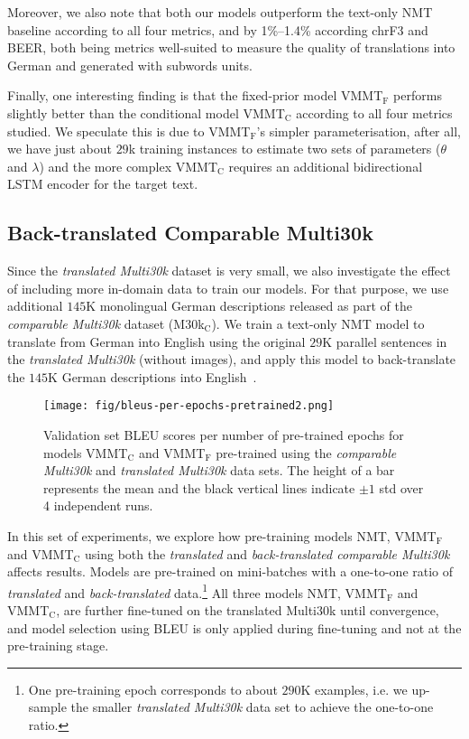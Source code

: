 \documentclass[11pt,a4paper]{article}
\newcommand{\cond}{VMMT$_{\text{C}}$\xspace}
\newcommand{\uncond}{VMMT$_{\text{F}}$\xspace}
\begin{document}
Moreover, we also note that both our models outperform the text-only NMT baseline according to all four metrics, and by 1\%--1.4\% according chrF3 and BEER, both being metrics well-suited to measure the quality of translations into German and generated with subwords units.

Finally, one interesting finding is that the fixed-prior model \uncond performs slightly better than the conditional model \cond according to all four metrics studied.
We speculate this is due to \uncond's simpler parameterisation, after all, we have just about $29$k training instances to estimate two sets of parameters ($\theta$ and $\lambda$) and the more complex \cond requires an additional bidirectional LSTM encoder for the target text.




\subsection{Back-translated Comparable Multi30k}\label{sec:backtranslated}

Since the \emph{translated Multi30k} dataset is very small, we also investigate the effect of including more in-domain data to train our models.
For that purpose, we use additional $145$K monolingual German descriptions released as part of the \emph{comparable Multi30k} dataset (M30k$_\text{C}$). We train a text-only NMT model to translate from German into English using the original $29$K parallel sentences in the \emph{translated Multi30k} (without images), and apply this model to back-translate the $145$K German descriptions into English~\citep{Sennrichetal:2016:Backtranslation}.


\begin{figure}[t!]
  \centering
  \texttt{[image: fig/bleus-per-epochs-pretrained2.png]}
  \caption{\label{fig:backtrans}Validation set BLEU scores per number of pre-trained epochs for models \cond and \uncond pre-trained using the \emph{comparable Multi30k} and \emph{translated Multi30k} data sets. The height of a bar represents the mean and the black vertical lines indicate $\pm 1$ std over 4 independent runs.}
\end{figure}

In this set of experiments, we explore how pre-training models NMT, \uncond and \cond using both the \emph{translated} and \emph{back-translated comparable Multi30k} affects results.
Models are pre-trained on mini-batches with a one-to-one ratio of \emph{translated} and \emph{back-translated} data.\footnote{One pre-training epoch corresponds to about $290$K examples, i.e. we up-sample the smaller \emph{translated Multi30k} data set to achieve the one-to-one ratio.}
All three models NMT, \uncond and \cond, are further fine-tuned on the translated Multi30k until convergence, and model selection using BLEU is only applied during fine-tuning and not at the pre-training stage.
\end{document}
